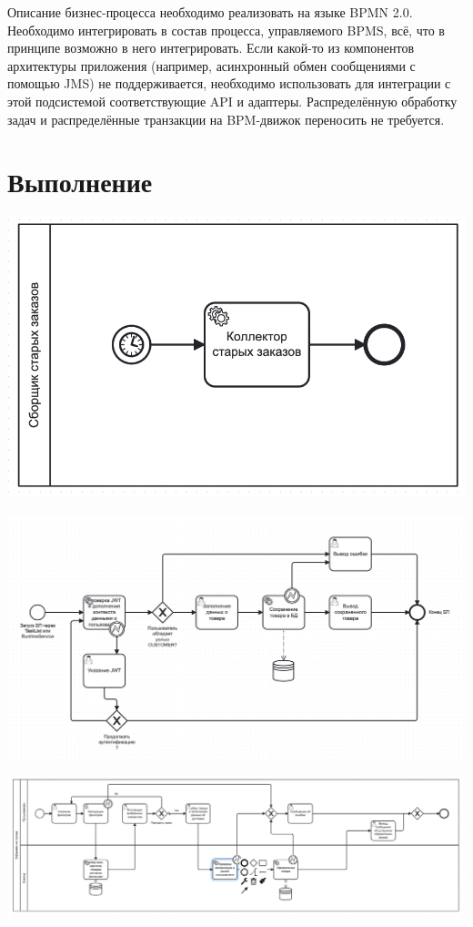\documentclass{article}
\begin{document}
Описание бизнес-процесса необходимо реализовать на языке BPMN 2.0.
Необходимо интегрировать в состав процесса, управляемого BPMS, всё, что в принципе возможно в него интегрировать. Если какой-то из компонентов архитектуры приложения (например, асинхронный обмен сообщениями с помощью JMS) не поддерживается, необходимо использовать для интеграции с этой подсистемой соответствующие API и адаптеры.
Распределённую обработку задач и распределённые транзакции на BPM-движок переносить не требуется.
\section*{Выполнение}

\begin{center}
    \includegraphics[width=.9\textwidth]{collector.png}
\end{center}

\begin{center}
    \includegraphics[width=.9\textwidth]{1.png}
\end{center}

\begin{center}
    \includegraphics[width=.9\textwidth]{2.png}
\end{center}
\end{document}
